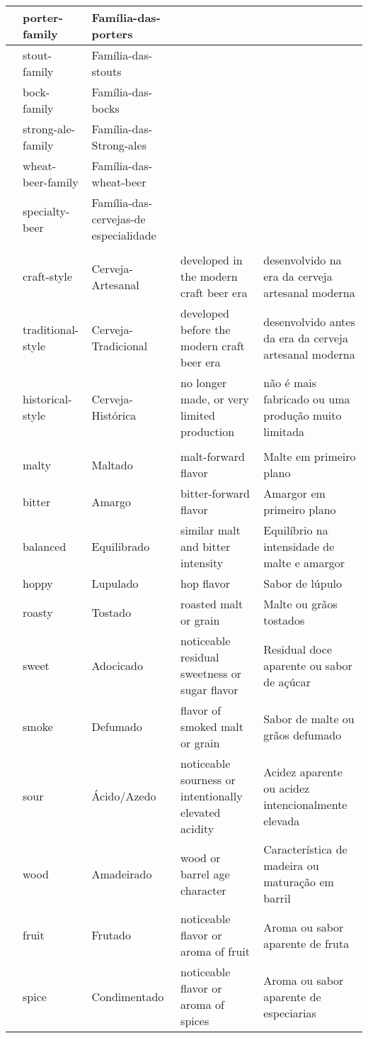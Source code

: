 \begin{longtable}{ | p{32mm} | p{32mm} | p{32mm} | p{32mm} | p{32mm} | }
\hline
& porter-family & Família-das-porters & & \\
\hline
& stout-family & Família-das-stouts & & \\
\hline
& bock-family & Família-das-bocks & & \\
\hline
& strong-ale-family & Família-das-Strong-ales & & \\
\hline
& wheat-beer-family & Família-das-wheat-beer & & \\
\hline
& specialty-beer & Família-das-cervejas-de especialidade & & \\
\hline
\rowcolor{darkgray}
\multicolumn{5}{|l|}{\color{white}\textbf{Era (Era)}} \\
\hline
& craft-style & Cerveja-Artesanal & developed in the modern craft beer era & desenvolvido na era da cerveja artesanal moderna \\
\hline
& traditional-style & Cerveja-Tradicional & developed before the modern craft beer era & desenvolvido antes da era da cerveja artesanal moderna \\
\hline
& historical-style & Cerveja-Histórica & no longer made, or very limited production & não é mais fabricado ou uma produção muito limitada \\
\hline
\rowcolor{darkgray}
\multicolumn{5}{|l|}{\color{white}\textbf{Dominant Flavor (Sabor Dominante)}} \\
\hline
& malty & Maltado & malt-forward flavor & Malte em primeiro plano \\
\hline
& bitter & Amargo & bitter-forward flavor & Amargor em primeiro plano \\
\hline
& balanced & Equilibrado & similar malt and bitter intensity & Equilíbrio na intensidade de malte e amargor \\
\hline
& hoppy & Lupulado & hop flavor & Sabor de lúpulo \\
\hline
& roasty & Tostado & roasted malt or grain & Malte ou grãos tostados \\
\hline
& sweet & Adocicado & noticeable residual sweetness or sugar flavor & Residual doce aparente ou sabor de açúcar \\
\hline
& smoke & Defumado & flavor of smoked malt or grain & Sabor de malte ou grãos defumado \\
\hline
& sour & Ácido/Azedo & noticeable sourness or intentionally elevated acidity & Acidez aparente ou acidez intencionalmente elevada \\
\hline
& wood & Amadeirado & wood or barrel age character & Característica de madeira ou maturação em barril \\
\hline
& fruit & Frutado & noticeable flavor or aroma of fruit & Aroma ou sabor aparente de fruta \\
\hline
& spice & Condimentado & noticeable flavor or aroma of spices & Aroma ou sabor aparente de especiarias \\
\hline
\end{longtable}
